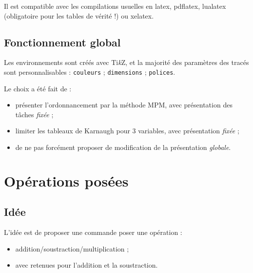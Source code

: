 \documentclass[french,a4paper,11pt]{article}
\providecommand\tikzlogo{Ti\textit{k}Z}
\let\TikZ\tikzlogo
\begin{document}
{{\begin{noteblock}
Il est compatible avec les compilations usuelles en \textsf{latex}, \textsf{pdflatex}, \textsf{lualatex} (obligatoire pour les tables de vérité !) ou \textsf{xelatex}.
\end{noteblock}

\subsection{Fonctionnement global}

\begin{tipblock}
Les environnements sont créés avec \TikZ, et la majorité des paramètres des tracés sont personnalisables : \texttt{couleurs} ; \texttt{dimensions} ; \texttt{polices}.
\end{tipblock}

\begin{noteblock}
Le choix a été fait de :

\begin{itemize}
	\item présenter l'ordonnancement par la méthode MPM, avec présentation des tâches \textit{fixée} ;
	\item limiter les tableaux de Karnaugh pour 3 variables, avec présentation \textit{fixée} ;
	\item de ne pas forcément proposer de modification de la présentation \textit{globale}.
\end{itemize}
\vspace*{-\baselineskip}\leavevmode
\end{noteblock}

\pagebreak

\section{Opérations posées}

\subsection{Idée}

\begin{tipblock}
L'idée est de proposer une commande poser une opération :

\begin{itemize}
	\item addition/soustraction/multiplication ;
	\item avec retenues pour l'addition et la soustraction.
\end{itemize}
\vspace*{-\baselineskip}\leavevmode
\end{tipblock}

}}
\end{document}
